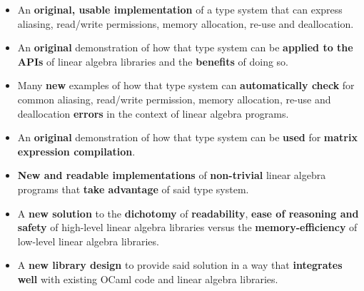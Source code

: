 \begin{itemize}

    \item An \textbf{original, usable implementation} of a type system that can express
        aliasing, read/write permissions, memory allocation, re-use and deallocation.

    \item An \textbf{original} demonstration of how that type system can be
        \textbf{applied to the APIs} of linear algebra libraries and the
        \textbf{benefits} of doing so.

    \item Many \textbf{new} examples of how that type system can \textbf{automatically
        check} for common aliasing, read/write permission, memory allocation,
        re-use and deallocation \textbf{errors} in the context of
        linear algebra programs.

    \item An \textbf{original} demonstration of how that type system can be
        \textbf{used} for \textbf{matrix expression compilation}.

    \item \textbf{New and readable implementations} of \textbf{non-trivial}
        linear algebra programs that \textbf{take advantage} of said type
        system.

    \item A \textbf{new solution} to the \textbf{dichotomy} of
        \textbf{readability}, \textbf{ease of reasoning and safety} of
        high-level linear algebra libraries versus the
        \textbf{memory-efficiency} of low-level linear algebra libraries.

    \item A \textbf{new library design} to provide said solution in a way that
        \textbf{integrates well} with existing OCaml code and linear algebra
        libraries.

\end{itemize}
